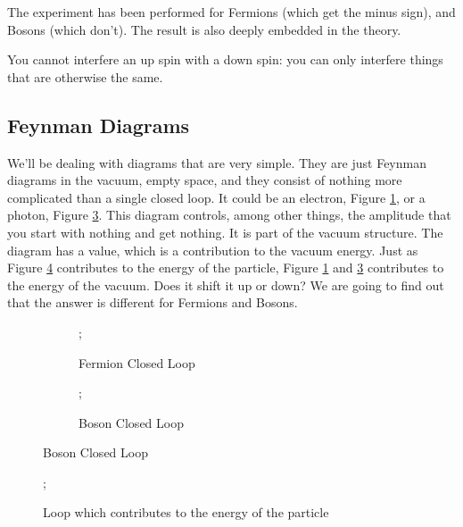 \documentclass[]{article}
\begin{document}
\begin{figure}[H]
\begin{subfigure}[t]{0.45\textwidth}
\begin{center}
		\end{center}
	\end{subfigure}
\end{figure}

The experiment has been performed for Fermions (which get the minus sign), and Bosons (which don't). The result is also deeply embedded in the theory.

You cannot interfere an up spin with a down spin: you can only interfere things that are otherwise the same.

\subsection{Feynman Diagrams}

We'll be dealing with diagrams that are very simple. They are just Feynman diagrams in the vacuum, empty space, and they consist of nothing more complicated than a single closed loop. It could be an electron, Figure \ref{fig:particles3-2-loops}, or a photon, Figure \ref{fig:particles3-2-loops-boson}. This diagram controls, among other things, the amplitude that you start with nothing and get nothing. It is part of the vacuum structure. The diagram has a  value, which is a contribution to the vacuum energy. Just as Figure \ref{fig:particles3-2-loops-p} contributes to the energy of the particle, Figure \ref{fig:particles3-2-loops} and \ref{fig:particles3-2-loops-boson} contributes to the energy of the vacuum. Does it shift it up or down? We are going to find out that the answer is different for Fermions and Bosons.


\begin{figure}[H]
	\caption{Closed Loops Feynman diagrams}
	\begin{subfigure}[t]{0.45\textwidth}
		\caption{Fermion Closed Loop}\label{fig:particles3-2-loops}
		;
	\end{subfigure}
	\begin{subfigure}[t]{0.45\textwidth}
		\caption{Boson Closed Loop}\label{fig:particles3-2-loops-boson}
		;
	\end{subfigure}
\end{figure}

\begin{figure}[h]
	\begin{center}
		\caption{Loop which contributes to the energy of the particle}\label{fig:particles3-2-loops-p}
		;
	\end{center}
\end{figure}
\end{document}
